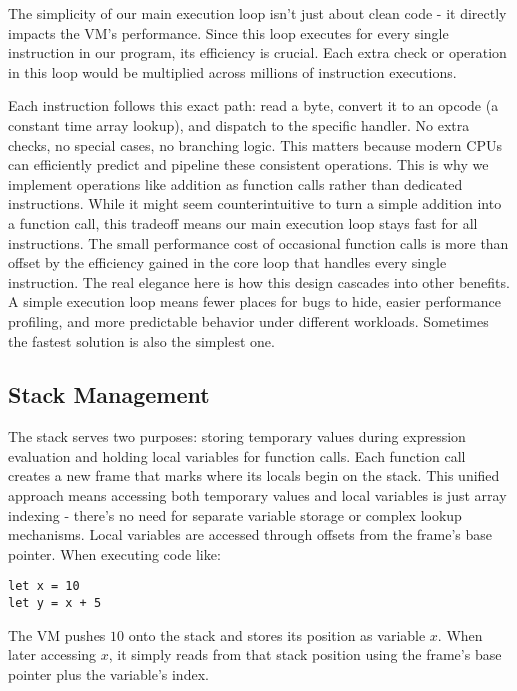 The simplicity of our main execution loop isn't just about clean code - it directly impacts the VM's performance.
Since this loop executes for every single instruction in our program, its efficiency is crucial.
Each extra check or operation in this loop would be multiplied across millions of instruction executions.

Each instruction follows this exact path: read a byte, convert it to an opcode (a constant time array lookup), and dispatch to the specific handler.
No extra checks, no special cases, no branching logic.
This matters because modern CPUs can efficiently predict and pipeline these consistent operations.
This is why we implement operations like addition as function calls rather than dedicated instructions.
While it might seem counterintuitive to turn a simple addition into a function call, this tradeoff means our main execution loop stays fast for all instructions.
The small performance cost of occasional function calls is more than offset by the efficiency gained in the core loop that handles every single instruction.
The real elegance here is how this design cascades into other benefits.
A simple execution loop means fewer places for bugs to hide, easier performance profiling, and more predictable behavior under different workloads.
Sometimes the fastest solution is also the simplest one.

\subsection{Stack Management}\label{subsec:stack-management}

The stack serves two purposes: storing temporary values during expression evaluation and holding local variables for function calls.
Each function call creates a new frame that marks where its locals begin on the stack.
This unified approach means accessing both temporary values and local variables is just array indexing - there's no need for separate variable storage or complex lookup mechanisms.
Local variables are accessed through offsets from the frame's base pointer.
When executing code like:

\begin{verbatim}
let x = 10
let y = x + 5
\end{verbatim}

The VM pushes $10$ onto the stack and stores its position as variable $x$.
When later accessing $x$, it simply reads 
from that stack position using the frame's base pointer plus the variable's index.

